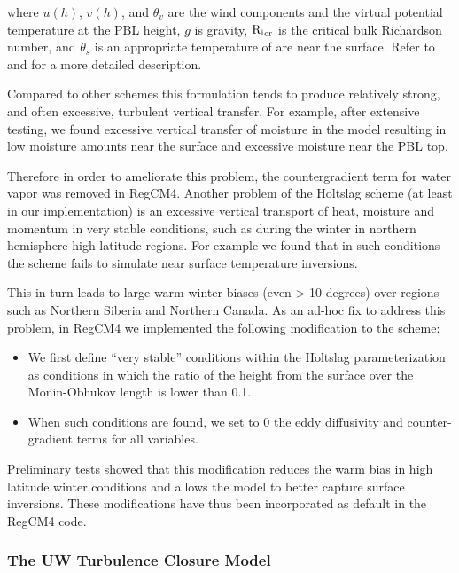 where $u(h)$, $v(h)$, and $\theta_v$ are the wind components and the
virtual potential temperature at the PBL height, $g$ is gravity, ${\rm {R_i}_{cr}}$
is the critical bulk Richardson number, and $\theta_s$ is an appropriate
temperature of are near the surface.  Refer to \cite{Holtslag_90} and
\cite{Holtslag_93} for a more detailed description.

Compared to other schemes this formulation tends to produce relatively strong,
and often excessive, turbulent vertical transfer.
For example, after extensive testing, we found excessive vertical transfer
of moisture in the model resulting in low moisture amounts near the surface
and excessive moisture near the PBL top.

Therefore in order to ameliorate this problem, the countergradient term for
water vapor was removed in \ac{RegCM4}. Another problem of the Holtslag scheme
(at least in our implementation) is an excessive vertical transport of heat,
moisture and momentum in very stable conditions, such as during the winter in
northern hemisphere high latitude regions. For example we found that in such
conditions the scheme fails to simulate near surface temperature inversions.

This in turn leads to large warm winter biases (even > 10 degrees) over regions
such as Northern Siberia and Northern Canada. As an ad-hoc fix to address this
problem, in \ac{RegCM4} we implemented the following modification to the scheme:

\begin{itemize}
\item We first define “very stable” conditions within the Holtslag
parameterization as conditions in which the ratio of the height from the
surface over the Monin-Obhukov length is lower than 0.1.
\item When such conditions are found, we set to 0 the eddy diffusivity
and counter-gradient terms for all variables.
\end{itemize}

Preliminary tests showed that this modification reduces the warm bias in high
latitude winter conditions and allows the model to better capture surface
inversions. These modifications have thus been incorporated as default in the
\ac{RegCM4} code.

\subsubsection{The UW Turbulence Closure Model}

